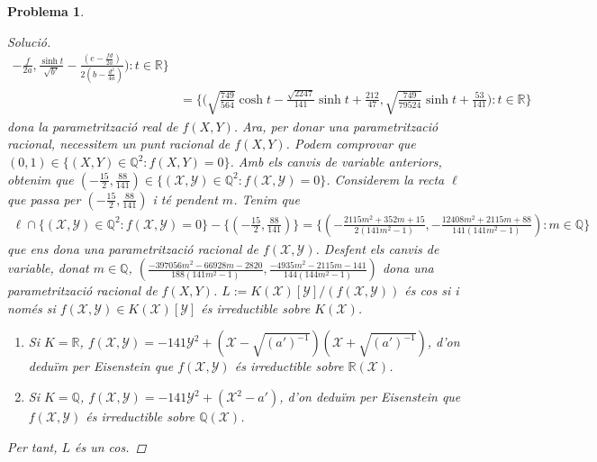 \documentclass[compress]{article}
\newtheorem{problema}{Problema}
\theoremstyle{definition}
\begin{document}
\begin{problema}
\begin{proof}[Solució]
\begin{align*}
            -\tfrac{f}{2a},
            \tfrac{\sinh{t}}{\sqrt{b'}}
            -\tfrac{(e-\frac{fd}{2a})}{2(b-\frac{d^{2}}{4a})}\big):t\in\mathbb{R}\}\\
            &=\{\big(\sqrt{\tfrac{749}{564}}\cosh{t}-\tfrac{\sqrt{2247}}{141}\sinh{t}+\tfrac{212}{47},\sqrt{\tfrac{749}{79524}}\sinh{t}+\tfrac{53}{141}\big):t\in\mathbb{R}\}
        \end{align*}
        dona la parametrització real de $f(X,Y)$. Ara, per donar una parametrització racional, necessitem un punt racional de $f(X,Y)$. Podem comprovar que $(0,1)\in\{(X,Y)\in\mathbb{Q}^{2}:f(X,Y)=0\}$. Amb els canvis de variable anteriors, obtenim que $(-\frac{15}{2},\frac{88}{141})\in\{(\mathscr{X},\mathscr{Y})\in\mathbb{Q}^{2}:f(\mathscr{X},\mathscr{Y})=0\}$. Considerem la recta $\ell$ que passa per $(-\frac{15}{2},\frac{88}{141})$ i té pendent $m$. Tenim que
        \begin{align*}
            \ell\cap\{(\mathscr{X},\mathscr{Y})\in\mathbb{Q}^{2}:f(\mathscr{X},\mathscr{Y})=0\}-\{(-\tfrac{15}{2},\tfrac{88}{141})\}
            =\{(-\tfrac{2115m^{2}+352m+15}{2(141m^{2}-1)},-\tfrac{12408m^{2}+2115m+88}{141(141m^{2}-1)}):m\in\mathbb{Q}\}
        \end{align*}
        que ens dona una parametrització racional de $f(\mathscr{X},\mathscr{Y})$. Desfent els canvis de variable, donat $m\in\mathbb{Q}$,\newline
        $(\frac{-397056m^{2}-66928m-2820}{188(141m^{2}-1)},\frac{-4935m^{2}-2115m-141}{144(144m^{2}-1)})$ dona una parametrització racional de $f(X,Y)$.\newline
        $L:=K(\mathscr{X})[\mathscr{Y}]/(f(\mathscr{X},\mathscr{Y}))$ és cos si i només si $f(\mathscr{X},\mathscr{Y})\in K(\mathscr{X})[\mathscr{Y}]$ és irreductible sobre $K(\mathscr{X})$.
        \begin{enumerate}
            \item Si $K=\mathbb{R}$, $f(\mathscr{X},\mathscr{Y})=-141\mathscr{Y}^{2}+(\mathscr{X}-\sqrt{(a')^{-1}})(\mathscr{X}+\sqrt{(a')^{-1}})$, d'on deduïm per Eisenstein que $f(\mathscr{X},\mathscr{Y})$ és irreductible sobre $\mathbb{R}(\mathscr{X})$.
            \item Si $K=\mathbb{Q}$, $f(\mathscr{X},\mathscr{Y})=-141\mathscr{Y}^{2}+(\mathscr{X}^{2}-a')$, d'on deduïm per Eisenstein que $f(\mathscr{X},\mathscr{Y})$ és irreductible sobre $\mathbb{Q}(\mathscr{X})$.
        \end{enumerate}
        Per tant, $L$ és un cos.\newline

\end{proof}
\end{problema}
\end{document}
